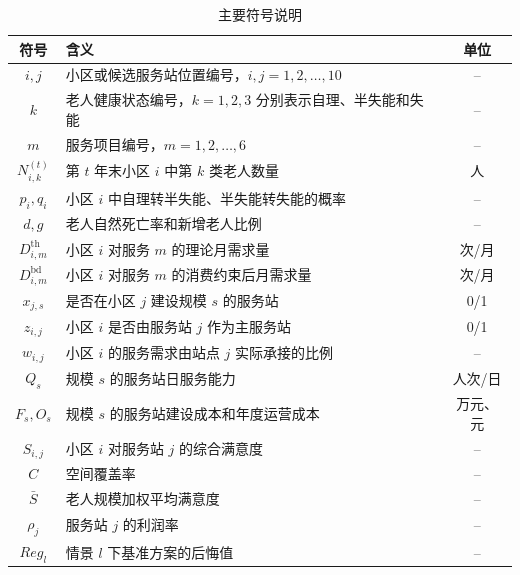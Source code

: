 \begin{table}[H]
\centering
\caption{主要符号说明}
\label{tab:symbols}
\begin{tabular}{c p{} c}
\toprule
符号 & 含义 & 单位 \\
\midrule
$i,j$ & 小区或候选服务站位置编号，$i,j=1,2,\ldots,10$ & -- \\
$k$ & 老人健康状态编号，$k=1,2,3$ 分别表示自理、半失能和失能 & -- \\
$m$ & 服务项目编号，$m=1,2,\ldots,6$ & -- \\
$N_{i,k}^{(t)}$ & 第 $t$ 年末小区 $i$ 中第 $k$ 类老人数量 & 人 \\
$p_i,q_i$ & 小区 $i$ 中自理转半失能、半失能转失能的概率 & -- \\
$d,g$ & 老人自然死亡率和新增老人比例 & -- \\
$D_{i,m}^{\mathrm{th}}$ & 小区 $i$ 对服务 $m$ 的理论月需求量 & 次/月 \\
$D_{i,m}^{\mathrm{bd}}$ & 小区 $i$ 对服务 $m$ 的消费约束后月需求量 & 次/月 \\
$x_{j,s}$ & 是否在小区 $j$ 建设规模 $s$ 的服务站 & 0/1 \\
$z_{i,j}$ & 小区 $i$ 是否由服务站 $j$ 作为主服务站 & 0/1 \\
$w_{i,j}$ & 小区 $i$ 的服务需求由站点 $j$ 实际承接的比例 & -- \\
$Q_s$ & 规模 $s$ 的服务站日服务能力 & 人次/日 \\
$F_s,O_s$ & 规模 $s$ 的服务站建设成本和年度运营成本 & 万元、元 \\
$S_{i,j}$ & 小区 $i$ 对服务站 $j$ 的综合满意度 & -- \\
$C$ & 空间覆盖率 & -- \\
$\bar{S}$ & 老人规模加权平均满意度 & -- \\
$\rho_j$ & 服务站 $j$ 的利润率 & -- \\
$Reg_l$ & 情景 $l$ 下基准方案的后悔值 & -- \\
\bottomrule
\end{tabular}
\end{table}
